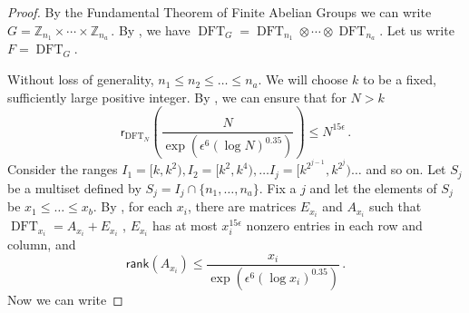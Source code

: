 \documentclass{toc}
\renewcommand\Z{{\mathbb{Z}}}
\newcommand\rank{\textsf{rank}}
\DeclareMathOperator{\DFT}{DFT}
\begin{document}
\begin{proof}
By the Fundamental Theorem of Finite Abelian Groups we can write 
$G = \Z_{n_1} \times \cdots \times \Z_{n_a}$\,.
%
By ,
%
%
we have $\DFT_G = \DFT_{n_1} \otimes \cdots \otimes \DFT_{n_a}$.  
Let us write $F = \DFT_G$. 
 
Without loss of generality, $n_1 \leq n_2 \leq \dots \leq n_a$.  We will choose $k$ to be a fixed, sufficiently large positive integer.  By , we can ensure that for $N > k$
%
%
%
%
\[
\textsf{r}_{\DFT_N}\left(\frac{N}{\exp\left(\epsilon^6 (\log N)^{0.35}\right)} \right) \leq N^{15 \epsilon} \,.
\]
%
Consider the ranges $I_1 = [k,k^2), I_2 = [k^2, k^4), \dots I_j = [k^{2^{j-1}},k^{2^j}) \dots $ and so on.  Let $S_j$ be a multiset defined by $S_j = I_j \cap \{n_1, \dots, n_a \}$.  Fix a $j$ and let the elements of $S_j$ be $x_1 \leq \dots \leq x_b$.  By , for each $x_i$, there are matrices $E_{x_i}$ and $A_{x_i}$ such that %
$\DFT_{x_i} = A_{x_i} + E_{x_i}$ %
, $E_{x_i}$ has at most $x_i^{15\epsilon}$ nonzero entries in each row and column, and 
\[
\rank(A_{x_i}) \leq \frac{x_i}{\exp\left(\epsilon^6 (\log x_i)^{0.35}\right)} \,.
\]
Now we can write


\end{proof}
\end{document}

